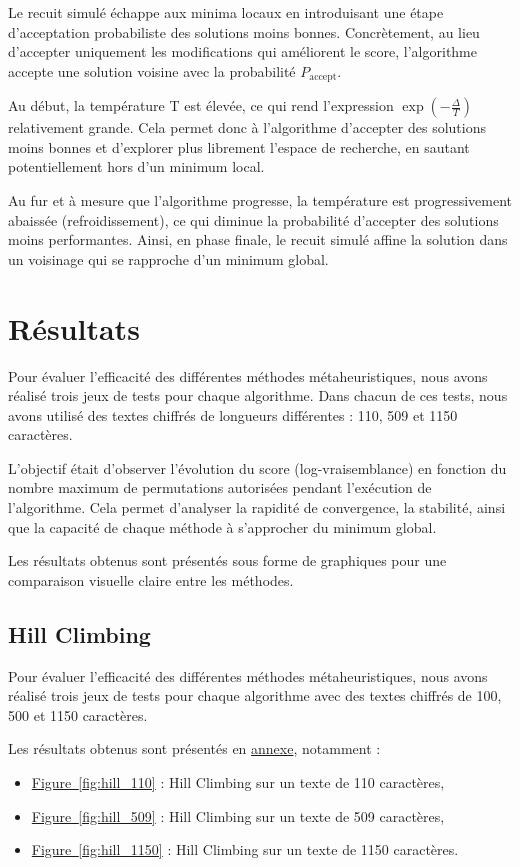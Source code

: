\documentclass[a4paper]{article}
\begin{document}
Le recuit simulé échappe aux minima locaux en introduisant une étape d'acceptation probabiliste des solutions moins bonnes. Concrètement, au lieu d'accepter uniquement les modifications qui améliorent le score, l'algorithme accepte une solution voisine avec la probabilité $P_{\text{accept}}$.

Au début, la température T est élevée, ce qui rend l'expression $\exp\left(-\frac{\Delta}{T}\right)$ relativement grande. Cela permet donc à l'algorithme d'accepter des solutions moins bonnes et d'explorer plus librement l'espace de recherche, en sautant potentiellement hors d'un minimum local.

Au fur et à mesure que l'algorithme progresse, la température est progressivement abaissée (refroidissement), ce qui diminue la probabilité d'accepter des solutions moins performantes. Ainsi, en phase finale, le recuit simulé affine la solution dans un voisinage qui se rapproche d'un minimum global.

\section{Résultats}

Pour évaluer l’efficacité des différentes méthodes métaheuristiques, nous avons réalisé trois jeux de tests pour chaque algorithme. Dans chacun de ces tests, nous avons utilisé des textes chiffrés de longueurs différentes : 110, 509 et 1150 caractères.

L'objectif était d'observer l’évolution du score (log-vraisemblance) en fonction du nombre maximum de permutations autorisées pendant l'exécution de l'algorithme. Cela permet d’analyser la rapidité de convergence, la stabilité, ainsi que la capacité de chaque méthode à s’approcher du minimum global.

Les résultats obtenus sont présentés sous forme de graphiques pour une comparaison visuelle claire entre les méthodes.

\subsection{Hill Climbing}

Pour évaluer l’efficacité des différentes méthodes métaheuristiques, nous avons réalisé trois jeux de tests pour chaque algorithme avec des textes chiffrés de 100, 500 et 1150 caractères.

Les résultats obtenus sont présentés en \hyperref[sec:annexes]{annexe}, notamment :
\begin{itemize}
    \item \hyperref[fig:hill_110]{Figure~\ref*{fig:hill_110}} : Hill Climbing sur un texte de 110 caractères,
    \item \hyperref[fig:hill_509]{Figure~\ref*{fig:hill_509}} : Hill Climbing sur un texte de 509 caractères,
    \item \hyperref[fig:hill_1150]{Figure~\ref*{fig:hill_1150}} : Hill Climbing sur un texte de 1150 caractères.
\end{itemize}
\end{document}
